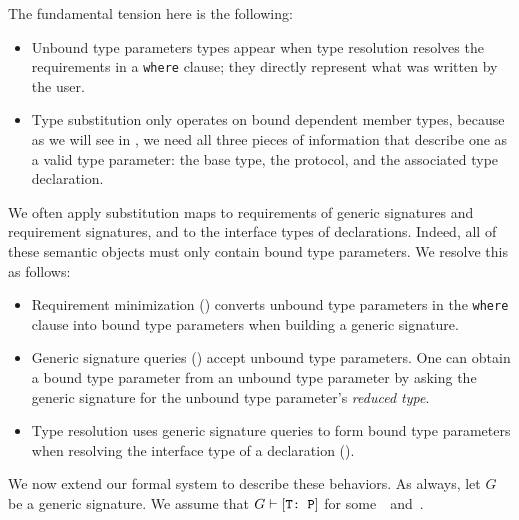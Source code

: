 \documentclass[../generics]{subfiles}
\begin{document}
The fundamental tension here is the following:
\begin{itemize}
\item Unbound type parameters types appear when type resolution resolves the requirements in a \texttt{where} clause; they directly represent what was written by the user.

\item Type substitution only operates on bound dependent member types, because as we will see in , we need all three pieces of information that describe one as a valid type parameter: the base type, the protocol, and the associated type declaration.
\end{itemize}
We often apply substitution maps to requirements of generic signatures and requirement signatures, and to the interface types of declarations. Indeed, all of these semantic objects must only contain bound type parameters. We resolve this as follows:
\begin{itemize}
\item Requirement minimization () converts unbound type parameters in the \texttt{where} clause into bound type parameters when building a generic signature.
\item Generic signature queries () accept unbound type parameters. One can obtain a bound type parameter from an unbound type parameter by asking the generic signature for the unbound type parameter's \emph{reduced type}.
\item Type resolution uses generic signature queries to form bound type parameters when resolving the interface type of a declaration ().
\end{itemize}

We now extend our formal system to describe these behaviors. As always, let $G$ be a generic signature. We assume that $G\vdash[\texttt{T:~P}]$ for some~\tT\ and~\tP.
\end{document}

